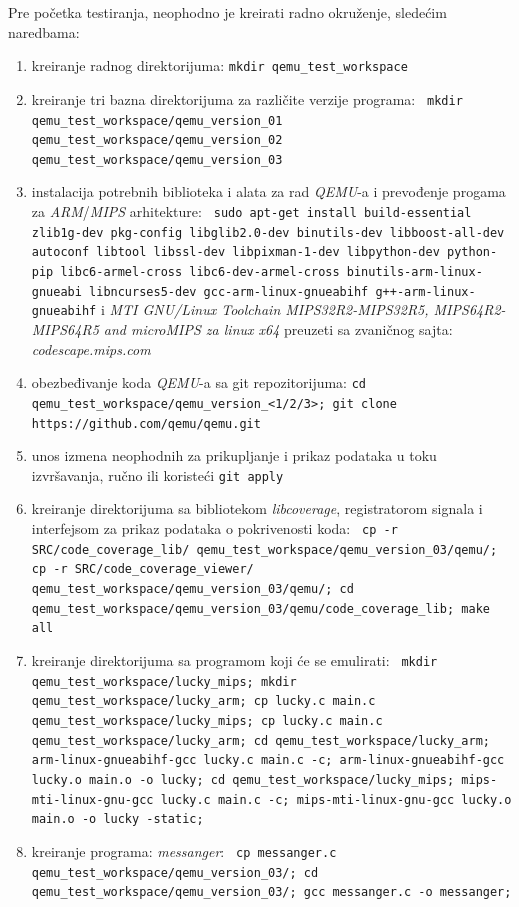 \documentclass[12pt,oneside]{memoir}
\newcommand{\kod}[1]{\texttt{#1}}
\newcommand{\strano}[1]{\textit{#1}}
\begin{document}
Pre početka testiranja, neophodno je kreirati radno okruženje, sledećim naredbama:
\begin{enumerate}
\item kreiranje radnog direktorijuma: \kod{mkdir qemu\_test\_workspace}
\item kreiranje tri bazna direktorijuma za različite verzije programa: \kod{ mkdir qemu\_test\_workspace/qemu\_version\_01 qemu\_test\_workspace/qemu\_version\_02 qemu\_test\_workspace/qemu\_version\_03}
\item instalacija potrebnih biblioteka i alata za rad \strano{QEMU}-a i prevođenje progama za \strano{ARM}/\strano{MIPS} arhitekture: \kod{ sudo apt-get install build-essential zlib1g-dev pkg-config libglib2.0-dev binutils-dev libboost-all-dev autoconf libtool libssl-dev libpixman-1-dev libpython-dev python-pip libc6-armel-cross libc6-dev-armel-cross binutils-arm-linux-gnueabi libncurses5-dev gcc-arm-linux-gnueabihf g++-arm-linux-gnueabihf} i \strano{MTI GNU/Linux Toolchain MIPS32R2-MIPS32R5, MIPS64R2-MIPS64R5 and microMIPS za linux x64} preuzeti sa zvaničnog sajta: \strano{codescape.mips.com}
\item obezbeđivanje koda \strano{QEMU}-a sa git repozitorijuma: \kod{cd qemu\_test\_workspace/qemu\_version\_<1/2/3>; git clone https://github.com/qemu/qemu.git}
\item unos izmena neophodnih za prikupljanje i prikaz podataka u toku izvršavanja, ručno ili koristeći \kod{git apply}
\item kreiranje direktorijuma sa bibliotekom \strano{libcoverage}, registratorom signala i interfejsom za prikaz podataka o pokrivenosti koda: \kod{ cp -r SRC/code\_coverage\_lib/ qemu\_test\_workspace/qemu\_version\_03/qemu/; cp -r SRC/code\_coverage\_viewer/ qemu\_test\_workspace/qemu\_version\_03/qemu/; cd qemu\_test\_workspace/qemu\_version\_03/qemu/code\_coverage\_lib; make all}
\item kreiranje direktorijuma sa programom koji će se emulirati: \kod{ mkdir qemu\_test\_workspace/lucky\_mips; mkdir qemu\_test\_workspace/lucky\_arm; cp lucky.c main.c qemu\_test\_workspace/lucky\_mips; cp lucky.c main.c qemu\_test\_workspace/lucky\_arm; cd qemu\_test\_workspace/lucky\_arm; arm-linux-gnueabihf-gcc lucky.c main.c -c; arm-linux-gnueabihf-gcc lucky.o main.o -o lucky; cd qemu\_test\_workspace/lucky\_mips; mips-mti-linux-gnu-gcc lucky.c main.c -c; mips-mti-linux-gnu-gcc lucky.o main.o -o lucky -static;}
\item kreiranje programa: \strano{messanger}: \kod{ cp messanger.c qemu\_test\_workspace/qemu\_version\_03/; cd qemu\_test\_workspace/qemu\_version\_03/; gcc messanger.c -o messanger;}
\end{enumerate}
\end{document}
